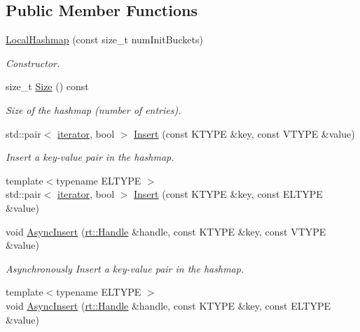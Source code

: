 \subsection*{Public Member Functions}
\begin{DoxyCompactItemize}
\item 
\hyperlink{classshad_1_1LocalHashmap_a6c0ce5d7583545126171e9de452b89d9}{Local\-Hashmap} (const size\-\_\-t num\-Init\-Buckets)
\begin{DoxyCompactList}\small\item\em Constructor. \end{DoxyCompactList}\item 
size\-\_\-t \hyperlink{classshad_1_1LocalHashmap_ac70c307f612b97f08f5e38bba7759665}{Size} () const 
\begin{DoxyCompactList}\small\item\em Size of the hashmap (number of entries). \end{DoxyCompactList}\item 
std\-::pair$<$ \hyperlink{classshad_1_1LocalHashmap_aafdf55e8d9fa4799bcef4881baf25a71}{iterator}, bool $>$ \hyperlink{classshad_1_1LocalHashmap_acc8cd3f5cf2147fb1e2a7b75900127d7}{Insert} (const K\-T\-Y\-P\-E \&key, const V\-T\-Y\-P\-E \&value)
\begin{DoxyCompactList}\small\item\em Insert a key-\/value pair in the hashmap. \end{DoxyCompactList}\item 
{\footnotesize template$<$typename E\-L\-T\-Y\-P\-E $>$ }\\std\-::pair$<$ \hyperlink{classshad_1_1LocalHashmap_aafdf55e8d9fa4799bcef4881baf25a71}{iterator}, bool $>$ \hyperlink{classshad_1_1LocalHashmap_a2492968014825ebe7ff90c40c623268d}{Insert} (const K\-T\-Y\-P\-E \&key, const E\-L\-T\-Y\-P\-E \&value)
\item 
void \hyperlink{classshad_1_1LocalHashmap_acb5581492e044c07bd0ceaa3a6892309}{Async\-Insert} (\hyperlink{classshad_1_1rt_1_1Handle}{rt\-::\-Handle} \&handle, const K\-T\-Y\-P\-E \&key, const V\-T\-Y\-P\-E \&value)
\begin{DoxyCompactList}\small\item\em Asynchronously Insert a key-\/value pair in the hashmap. \end{DoxyCompactList}\item 
{\footnotesize template$<$typename E\-L\-T\-Y\-P\-E $>$ }\\void \hyperlink{classshad_1_1LocalHashmap_ace0dd4d4a9caee1d915af6efcb4fc2c6}{Async\-Insert} (\hyperlink{classshad_1_1rt_1_1Handle}{rt\-::\-Handle} \&handle, const K\-T\-Y\-P\-E \&key, const E\-L\-T\-Y\-P\-E \&value)

\end{DoxyCompactItemize}
